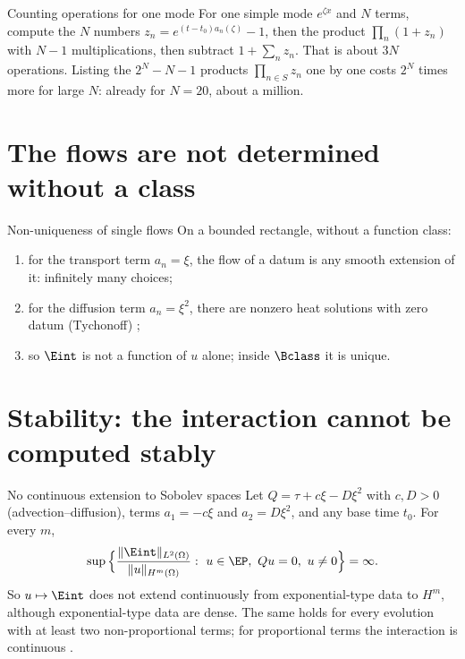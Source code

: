 \begin{example}{Counting operations for one mode}
For one simple mode $e^{\zeta x}$ and $N$ terms, compute the $N$ numbers $z_n=e^{(t-t_0)a_n(\zeta)}-1$, then the product $\prod_n(1+z_n)$ with $N-1$ multiplications, then subtract $1+\sum_nz_n$. That is about $3N$ operations. Listing the $2^N-N-1$ products $\prod_{n\in S}z_n$ one by one costs $2^N$ times more for large $N$: already for $N=20$, about a million.
\end{example}

\section{The flows are not determined without a class}

\begin{proposition}{Non-uniqueness of single flows  \proved}\label{prop:nonuniq}
On a bounded rectangle, without a function class:
\begin{enumerate}[label=(\alph*)]
\item for the transport term $a_n=\xi$, the flow of a datum is any smooth extension of it: infinitely many choices;
\item for the diffusion term $a_n=\xi^2$, there are nonzero heat solutions with zero datum (Tychonoff) \cf;
\item so $\Eint$ is not a function of $u$ alone; inside $\Bclass$ it is unique.
\end{enumerate}
\end{proposition}

\section{Stability: the interaction cannot be computed stably}

\begin{theorem}{No continuous extension to Sobolev spaces  \falsest}\label{thm:nocont}
Let $Q=\tau+c\xi-D\xi^2$ with $c,D>0$ (advection--diffusion), terms $a_1=-c\xi$ and $a_2=D\xi^2$, and any base time $t_0$. For every $m$,
\[
\sup\Big\{\frac{\|\Eint\|_{L^2(\Omega)}}{\|u\|_{H^m(\Omega)}}:\ u\in\EP,\ Qu=0,\ u\ne0\Big\}=\infty .
\]
So $u\mapsto\Eint$ does not extend continuously from exponential-type data to $H^m$, although exponential-type data are dense. The same holds for every evolution with at least two non-proportional terms; for proportional terms the interaction is continuous  \proved.

\end{theorem}


